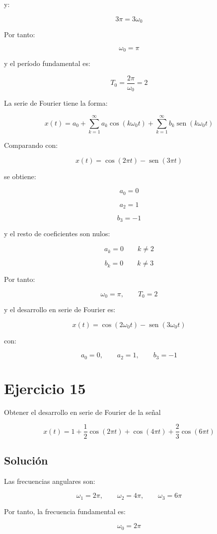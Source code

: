 \documentclass[fleqn]{article}
\DeclareMathOperator{\sen}{sen}
\begin{document}
	y:

	\[
	3\pi=3\omega_0
	\]

	Por tanto:

	\[
	\omega_0=\pi
	\]

	y el período fundamental es:

	\[
	T_0=\frac{2\pi}{\omega_0}=2
	\]

	La serie de Fourier tiene la forma:

	\[
	x(t)
	=
	a_0
	+
	\sum_{k=1}^{\infty}
	a_k\cos(k\omega_0t)
	+
	\sum_{k=1}^{\infty}
	b_k\sen(k\omega_0t)
	\]

	Comparando con:

	\[
	x(t)
	=
	\cos(2\pi t)-\sen(3\pi t)
	\]

	se obtiene:

	\[
	a_0=0
	\]

	\[
	a_2=1
	\]

	\[
	b_3=-1
	\]

	y el resto de coeficientes son nulos:

	\[
	a_k=0
	\qquad
	k\neq2
	\]

	\[
	b_k=0
	\qquad
	k\neq3
	\]

	Por tanto:

	\[
	\boxed{
	\omega_0=\pi,
	\qquad
	T_0=2
	}
	\]

	y el desarrollo en serie de Fourier es:

	\[
	\boxed{
	x(t)
	=
	\cos(2\omega_0t)
	-
	\sen(3\omega_0t)
	}
	\]

	con:

	\[
	\boxed{
	a_0=0,\qquad
	a_2=1,\qquad
	b_3=-1
	}
	\]

\section{Ejercicio 15}
	Obtener el desarrollo en serie de Fourier de la señal

	\[
	x(t)
	=
	1+\frac{1}{2}\cos(2\pi t)
	+\cos(4\pi t)
	+\frac{2}{3}\cos(6\pi t)
	\]

	\subsection{Solución}

	Las frecuencias angulares son:

	\[
	\omega_1=2\pi,
	\qquad
	\omega_2=4\pi,
	\qquad
	\omega_3=6\pi
	\]

	Por tanto, la frecuencia fundamental es:

	\[
	\omega_0=2\pi
	\]
\end{document}
